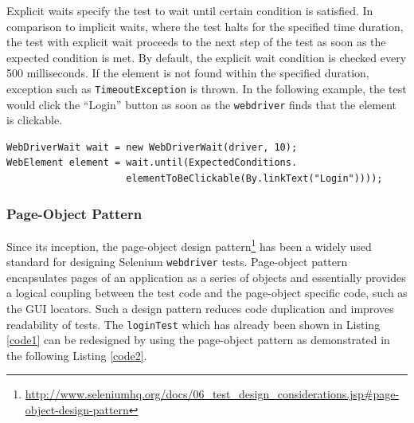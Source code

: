 Explicit waits specify the test to wait until certain condition is satisfied. In comparison to implicit waits, where the test halts for the specified time duration, the test with explicit wait proceeds to the next step of the test as soon as the expected condition is met. By default, the explicit wait condition is checked every 500 milliseconds. If the element is not found within the specified duration, exception such as \texttt{TimeoutException} is thrown. In the following example, the test would click the ``Login'' button as soon as the \texttt{webdriver} finds that the element is clickable.
\begin{small}
\begin{verbatim}
WebDriverWait wait = new WebDriverWait(driver, 10);
WebElement element = wait.until(ExpectedConditions.
                     elementToBeClickable(By.linkText("Login"))));
\end{verbatim}
\end{small}

\subsubsection{Page-Object Pattern}
\label{page-object}
Since its inception, the page-object design pattern\footnote{\url{http://www.seleniumhq.org/docs/06_test_design_considerations.jsp\#page-object-design-pattern}} has been a widely used standard for designing Selenium \texttt{webdriver} tests. 
Page-object pattern encapsulates pages of an application as a series of objects and essentially provides a logical coupling between the test code and the page-object specific code, such as the GUI locators. Such a design pattern reduces code duplication and improves readability of tests. The \texttt{loginTest} which has already been shown in Listing \ref{code1} can be redesigned by using the page-object pattern as demonstrated in the following Listing \ref{code2}.

